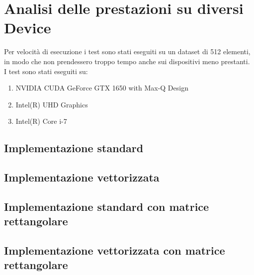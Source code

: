 \documentclass[../relazione.tex]{subfiles}
\begin{document}
\section{Analisi delle prestazioni su diversi Device}
Per velocità di esecuzione i test sono stati eseguiti su un dataset di 512 elementi, in modo che non prendessero troppo tempo anche sui dispositivi meno prestanti.
I test sono stati eseguiti su:
\begin{enumerate}
    \item NVIDIA CUDA GeForce GTX 1650 with Max-Q Design				
    \item Intel(R) UHD Graphics
    \item Intel(R) Core i-7
\end{enumerate}

\subsection{Implementazione standard}
\subsection{Implementazione vettorizzata}
\subsection{Implementazione standard con matrice rettangolare}
\subsection{Implementazione vettorizzata con matrice rettangolare}
\end{document}
